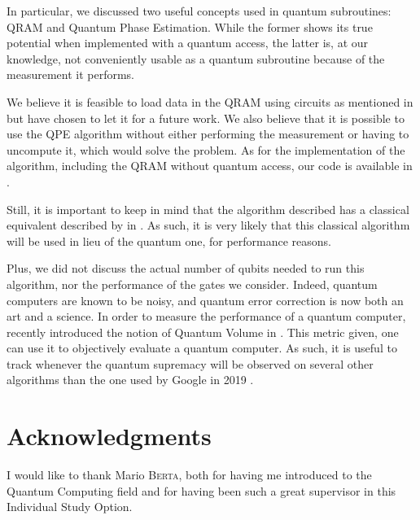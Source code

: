 \documentclass[11pt, a4paper]{article}
\begin{document}
        In particular, we discussed two useful concepts used in quantum subroutines: QRAM and Quantum Phase Estimation. While the former shows its true potential when implemented with a quantum access, the latter is, at our knowledge, not conveniently usable as a quantum subroutine because of the measurement it performs.
        
        We believe it is feasible to load data in the QRAM using circuits as mentioned in \cite{QRAMCircuit} but have chosen to let it for a future work. We also believe that it is possible to use the QPE algorithm without either performing the measurement or having to uncompute it, which would solve the problem. As for the implementation of the algorithm, including the QRAM without quantum access, our code is available in \cite{GithubNemoz}.
        
        Still, it is important to keep in mind that the algorithm described has a classical equivalent described by \citeauthor{Dequantized} in \cite{Dequantized}. As such, it is very likely that this classical algorithm will be used in lieu of the quantum one, for performance reasons.
        
        Plus, we did not discuss the actual number of qubits needed to run this algorithm, nor the performance of the gates we consider. Indeed, quantum computers are known to be noisy, and quantum error correction is now both an art and a science. In order to measure the performance of a quantum computer, \citeauthor{QVolume} recently introduced the notion of Quantum Volume in \cite{QVolume}. This metric given, one can use it to objectively evaluate a quantum computer. As such, it is useful to track whenever the quantum supremacy will be observed on several other algorithms than the one used by Google in 2019 \cite{Supremacy}.
    
    \section{Acknowledgments}
        I would like to thank Mario \textsc{Berta}, both for having me introduced to the Quantum Computing field and for having been such a great supervisor in this Individual Study Option.

    \printbibliography
\end{document}
